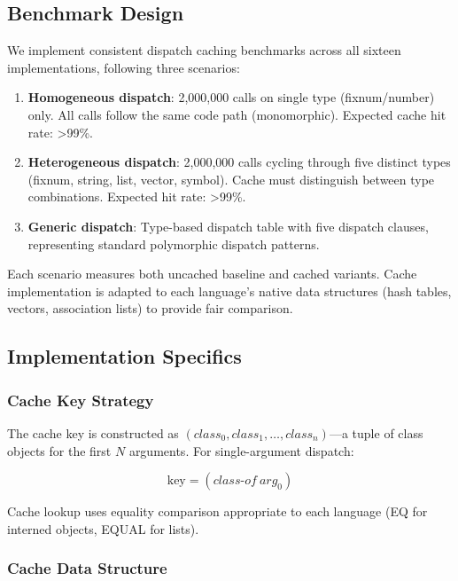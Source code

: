 \documentclass[sigplan,final]{acmart}
\begin{document}
\subsection{Benchmark Design}

We implement consistent dispatch caching benchmarks across all sixteen implementations, following
three scenarios:

\begin{enumerate}
  \item \textbf{Homogeneous dispatch}: 2,000,000 calls on single type (fixnum/number) only.
    All calls follow the same code path (monomorphic). Expected cache hit rate: >99\%.

  \item \textbf{Heterogeneous dispatch}: 2,000,000 calls cycling through five distinct types
    (fixnum, string, list, vector, symbol). Cache must distinguish between type combinations.
    Expected hit rate: >99\%.

  \item \textbf{Generic dispatch}: Type-based dispatch table with five dispatch clauses,
    representing standard polymorphic dispatch patterns.
\end{enumerate}

Each scenario measures both uncached baseline and cached variants. Cache implementation is adapted
to each language's native data structures (hash tables, vectors, association lists) to provide
fair comparison.

\subsection{Implementation Specifics}

\subsubsection{Cache Key Strategy}

The cache key is constructed as $(class_0, class_1, \ldots, class_n)$—a tuple of class objects
for the first $N$ arguments. For single-argument dispatch:

\begin{equation}
\text{key} = (class\text{-}of~arg_0)
\end{equation}

Cache lookup uses equality comparison appropriate to each language (EQ for interned objects,
EQUAL for lists).

\subsubsection{Cache Data Structure}
\end{document}
